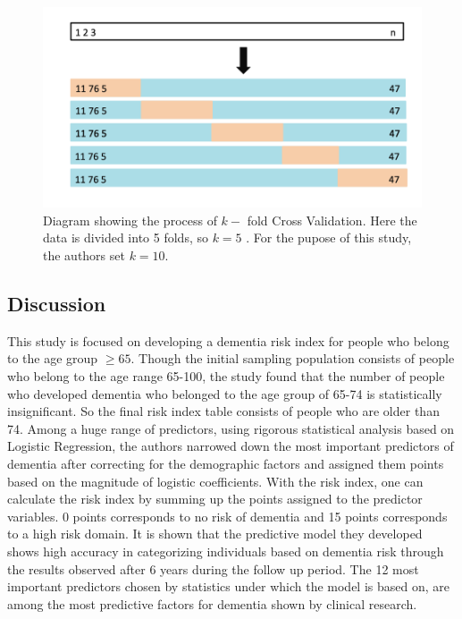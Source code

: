 \documentclass[12pt,letterpaper]{article}
\begin{document}
\begin{figure}[b!]
\centering
\includegraphics[width=13.2cm]{CV.png}
\caption{Diagram showing the process of $k-$ fold Cross Validation. Here the data is divided into 5 folds, so $k=5$ \cite{intro2013}. For the pupose of this study, the authors set $k=10$. }
\label{cv}
\end{figure}
\subsection{Discussion}

This study is focused on developing a dementia risk index for people who belong to the age group $\geq 65$. Though the initial sampling population consists of people who belong to the age range 65-100, the study found that the number of people who developed dementia who belonged to the age group of 65-74 is statistically insignificant. So the final risk index table consists of people who are older than 74. Among a huge range of predictors, using rigorous statistical analysis based on Logistic Regression, the authors narrowed down the most important predictors of dementia after correcting for the demographic factors and assigned them points based on the magnitude of logistic coefficients. With the risk index, one can calculate the risk index by summing up the points assigned to the predictor variables. 0 points corresponds to no risk of dementia and 15 points corresponds to a high risk domain. It is shown that the predictive model they developed shows high accuracy in categorizing individuals based on dementia risk through the results observed after 6 years during the follow up period. The 12 most important predictors chosen by statistics under which the model is based on, are among the most predictive factors for dementia shown by clinical research. \\
\end{document}
